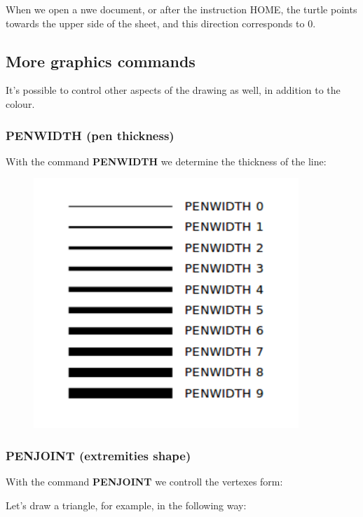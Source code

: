 \vskip 1cm

When we open a nwe document, or after the instruction HOME, the turtle points towards the upper side of the sheet, and this direction corresponds to 0\degree.

\subsection{More graphics commands}

It's possible to control other aspects of the drawing as well, in addition to the colour.

\subsubsection{PENWIDTH (pen thickness)}

With the command \textbf{PENWIDTH} we determine the thickness of the line:

\vskip 1cm

\begin{figure}[H]
   \centering
   \includegraphics[width=10.0cm,trim=8 8 8 8,clip]{./images/disegnare/disegnare-33.png}
   \label{dis-33}
\end{figure}

\vskip 1cm

\subsubsection{PENJOINT (extremities shape)}

With the command \textbf{PENJOINT} we controll the vertexes form: 

Let's draw a triangle, for example, in the following way:

